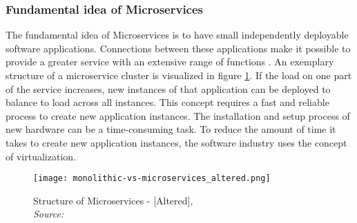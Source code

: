 \documentclass[12pt, a4paper]{article}
\begin{document}
        \subsubsection{Fundamental idea of Microservices}
        The fundamental idea of Microservices is to have small independently deployable software applications. Connections between these applications make it possible to provide a greater service with an extensive range of functions \cite{micro}. An exemplary structure of a microservice cluster is visualized in figure \ref{fig::micro}. If the load on one part of the service increases, new instances of that application can be deployed to balance to load across all instances. This concept requires a fast and reliable process to create new application instances.\newline
        The installation and setup process of new hardware can be a time-consuming task. To reduce the amount of time it takes to create new application instances, the software industry uses the concept of virtualization.

        \begin{figure}
            \centering
            \texttt{[image: monolithic-vs-microservices\_altered.png]}
            \caption{Structure of Microservices - [Altered], \\\textit{Source:~\cite{redhat_micro}}}\label{fig::micro}
        \end{figure}
\end{document}
